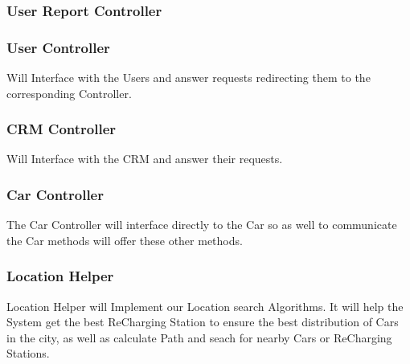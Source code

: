 \documentclass[a4paper]{article}
\begin{document}
\subsubsection{User Report Controller}
\begin{figure}[h]
\centering
\vspace*{\fill}
\noindent{}%
\vspace*{0.1cm}
\end{figure}

\newpage
\subsubsection{User Controller}
Will Interface with the Users and answer requests redirecting them to the corresponding Controller.
\begin{figure}[h]
\centering
\vspace*{\fill}
\noindent{}%
\vspace*{0.1cm}
\end{figure}

\subsubsection{CRM Controller}
Will Interface with the CRM and answer their requests.
\begin{figure}[h]
\centering
\vspace*{\fill}
\noindent{}%
\vspace*{0.1cm}
\end{figure}

\subsubsection{Car Controller}
The Car Controller will interface directly to the Car so as well to communicate the Car methods will offer these other methods.
\begin{figure}[h]
\centering
\vspace*{\fill}
\noindent{}%
\vspace*{0.1cm}
\end{figure}

\subsubsection{Location Helper}
Location Helper will Implement our Location search Algorithms. It will help the System get the best ReCharging Station to ensure the best distribution of Cars in the city, as well as calculate Path and seach for nearby Cars or ReCharging Stations.
\begin{figure}[h]
\centering
\vspace*{\fill}
\noindent{}%
\vspace*{0.1cm}
\end{figure}
\end{document}
